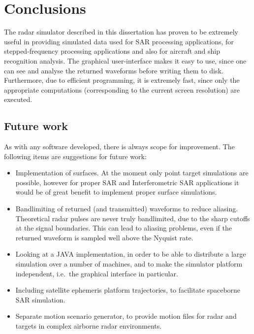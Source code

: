                       

\chapter{Conclusions\label{chapter:concl}}

The radar simulator described in this dissertation has proven to be
extremely useful in providing simulated data used for SAR processing
applications, for stepped-frequency processing applications and also for
aircraft and ship recognition analysis. The graphical user-interface makes
it easy to use, since one can see and analyse the returned waveforms before
writing them to disk. Furthermore, due to efficient programming, it is
extremely fast, since only the appropriate computations (corresponding to
the current screen resolution) are executed.

\section{Future work}

As with any software developed, there is always scope for improvement. The
following items are suggestions for future work:

\begin{itemize}
\item  Implementation of surfaces. At the moment only point target
simulations are possible, however for proper SAR and Interferometric SAR
applications it would be of great benefit to implement proper surface
simulations.

\item  Bandlimiting of returned (and transmitted) waveforms to reduce
aliasing. Theoretical radar pulses are never truly bandlimited, due to the
sharp cutoffs at the signal boundaries. This can lead to aliasing problems,
even if the returned waveform is sampled well above the Nyquist rate.

\item   Looking at a JAVA implementation, in order to be able to distribute
a large simulation over a number of machines, and to make the simulator
platform independent, i.e.~the graphical interface in particular.

\item  Including satellite ephemeris platform trajectories, to facilitate
spaceborne SAR simulation.

\item  Separate motion scenario generator, to provide motion files for radar
and targets in complex airborne radar environments.
\end{itemize}
